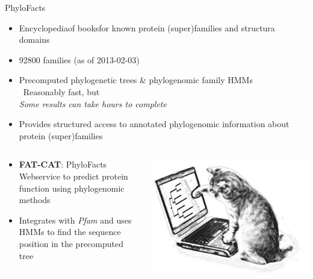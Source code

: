 \documentclass[14pt,xcolor=dvipsnames,pdftex]{beamer}
\begin{document}
\begin{frame}[allowframebreaks]{PhyloFacts}
 \begin{itemize}
  \item \glqq Encyclopedia\grqq of \glqq books\grqq for known protein (super)families and structura domains
  \item 92800 families (as of 2013-02-03)
  \item Precomputed phylogenetic trees \& phylogenomic family HMMs\\
  \textrightarrow\ Reasonably fast, but\\\glqq\textit{Some results can take hours to complete}\grqq
  \item Provides structured access to annotated phylogenomic information about protein (super)families
 \end{itemize}
 \framebreak
 \begin{columns}[T]
 \begin{column}{.7\textwidth}
 \begin{itemize}
  \item \textbf{FAT-CAT}: PhyloFacts Webservice to predict protein function using phylogenomic methods
  \item Integrates with \textit{Pfam} and uses HMMs to find the sequence position in the precomputed tree
 \end{itemize}
 \end{column}
  \begin{column}{.3\textwidth}
   \includegraphics[width=1.2\textwidth]{figures/fatcat.jpg}
  \end{column}
 \end{columns}

\end{frame}
\end{document}
